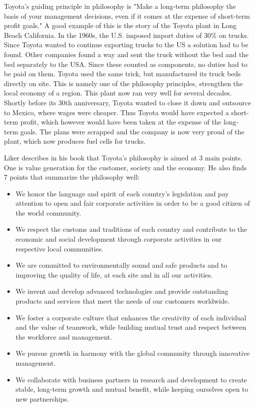 \documentclass[a4paper,11pt]{article}
\begin{document}
Toyota's guiding principle in philosophy is "Make a long-term philosophy the
basis of your management decisions, even if it comes at the expense of
short-term profit goals." A good example of this is the story of the Toyota
plant in Long Beach California. In the 1960s, the U.S. imposed import duties
of 30\% on trucks. Since Toyota wanted to continue exporting trucks to the US
a solution had to be found. Other companies found a way and sent the truck
without the bed and the bed separately to the USA. Since these counted as
components, no duties had to be paid on them. Toyota used the same trick, but
manufactured its truck beds directly on site. This is namely one of the
philosophy principles, strengthen the local economy of a region. This plant
now ran very well for several decades. Shortly before its 30th anniversary,
Toyota wanted to close it down and outsource to Mexico, where wages were
cheaper. Thus Toyota would have expected a short-term profit, which however
would have been taken at the expense of the long-term goals. The plans were
scrapped and the company is now very proud of the plant, which now produces
fuel cells for trucks.

Liker describes in his book that Toyota's philosophy is aimed at 3 main
points. One is value generation for the customer, society and the economy. He
also finds 7 points that summarize the philosophy well:

\begin{itemize}
\item We honor the language and spirit of each country's legislation and pay
  attention to open and fair corporate activities in order to be a good
  citizen of the world community.
\item We respect the customs and traditions of each country and contribute to
  the economic and social development through corporate activities in our
  respective local communities.
\item We are committed to environmentally sound and safe products and to
  improving the quality of life, at each site and in all our activities.
\item We invent and develop advanced technologies and provide outstanding
  products and services that meet the needs of our customers worldwide.
\item We foster a corporate culture that enhances the creativity of each
  individual and the value of teamwork, while building mutual trust and
  respect between the workforce and management.
\item We pursue growth in harmony with the global community through innovative
  management.
\item We collaborate with business partners in research and development to
  create stable, long-term growth and mutual benefit, while keeping ourselves
  open to new partnerships.
\end{itemize}
\end{document}
